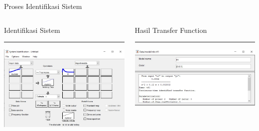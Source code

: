 \documentclass[10pt,xcolor={dvipsnames}]{beamer}
\begin{document}
\begin{frame}{Proses Identifikasi Sistem}
	\begin{columns}[T] %
		\begin{column}{0.48\textwidth}
			Identifikasi Sistem
			\color{black}\rule{\linewidth}{4pt}
			\includegraphics[width=7.5cm]{Hasil Matlab/prosesident.jpg}
		\end{column}%
		\hfill%
		\begin{column}{0.48\textwidth}
			Hasil Transfer Function
			\color{blue}\rule{\linewidth}{4pt}
			\begin{center}
				\includegraphics[width=7.5cm]{Hasil Matlab/hasiltf.jpg}
			\end{center}
		\end{column}
	\end{columns}
\end{frame}
\end{document}
